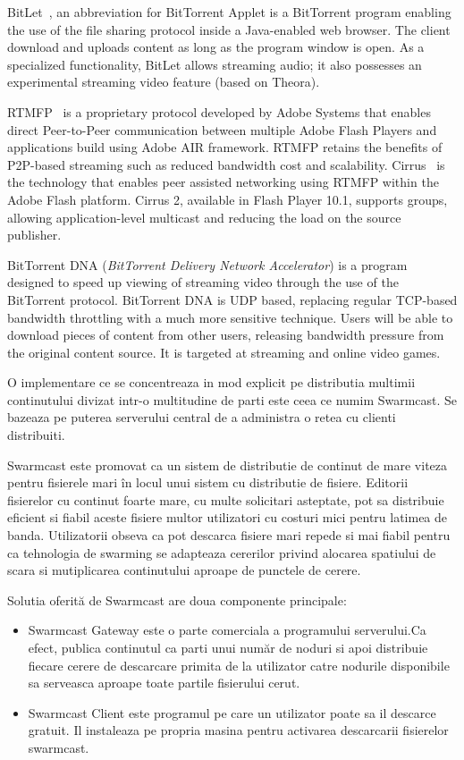 BitLet~\cite{bitlet}, an abbreviation for BitTorrent Applet is a BitTorrent
program enabling the use of the file sharing protocol inside a Java-enabled
web browser. The client download and uploads content as long as the program
window is open. As a specialized functionality, BitLet allows streaming audio;
it also possesses an experimental streaming video feature (based on Theora).

RTMFP~\cite{rtmfp} is a proprietary protocol developed by Adobe Systems that
enables direct Peer-to-Peer communication between multiple Adobe Flash Players
and applications build using Adobe AIR framework. RTMFP retains the benefits
of P2P-based streaming such as reduced bandwidth cost and scalability.
Cirrus~\cite{cirrus} is the technology that enables peer assisted networking
using RTMFP within the Adobe Flash platform. Cirrus 2, available in Flash
Player 10.1, supports groups, allowing application-level multicast and
reducing the load on the source publisher.

BitTorrent DNA (\textit{BitTorrent Delivery Network Accelerator}) is a program
designed to speed up viewing of streaming video through the use of the
BitTorrent protocol. BitTorrent DNA is UDP based, replacing regular TCP-based
bandwidth throttling with a much more sensitive technique. Users will be able
to download pieces of content from other users, releasing bandwidth pressure
from the original content source. It is targeted at streaming and online video
games.

O implementare ce se concentreaza in mod explicit pe distributia multimii
continutului divizat intr-o multitudine de parti este ceea ce numim Swarmcast.
Se bazeaza pe puterea serverului central de a administra o retea cu clienti
distribuiti.

Swarmcast este promovat ca un sistem de distributie de continut de mare viteza
pentru fisierele mari în locul unui sistem cu distributie de fisiere. Editorii
fisierelor cu continut foarte mare, cu multe solicitari asteptate, pot sa
distribuie eficient si fiabil aceste fisiere multor utilizatori cu costuri
mici pentru latimea de banda. Utilizatorii obseva ca pot descarca fisiere mari
repede si mai fiabil pentru ca tehnologia de swarming se adapteaza cererilor
privind alocarea spatiului de scara si mutiplicarea continutului aproape de
punctele de cerere.

Solutia oferită de Swarmcast are doua componente principale:

\begin{itemize}
  \item{Swarmcast Gateway este o parte comerciala a programului serverului.Ca
  efect, publica continutul ca parti unui număr de noduri si apoi distribuie
  fiecare cerere de descarcare primita de la utilizator catre nodurile
  disponibile sa serveasca aproape toate partile fisierului cerut.}
  \item{Swarmcast Client este programul pe care un utilizator poate sa il
  descarce gratuit. Il instaleaza pe propria masina pentru activarea
  descarcarii fisierelor swarmcast.}
\end{itemize}

